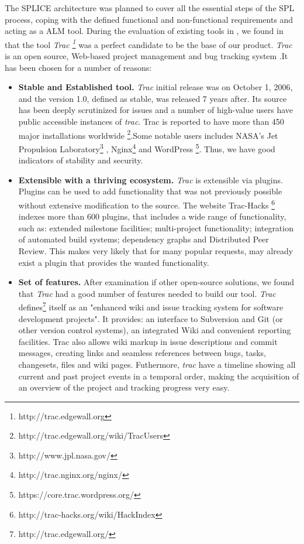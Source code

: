 The \ac{SPLICE} architecture was planned to cover all the essential steps of the \acf{SPL} process, coping with the defined functional and non-functional requirements and acting as a \acf{ALM} tool.  During the evaluation of existing tools in , we found in that the tool \textit{Trac \footnote{http://trac.edgewall.org}} was a perfect candidate to be the base of our product. \textit{Trac} is an open source, Web-based project management and bug tracking system .It has been chosen for a number of reasons:
\begin{itemize}
\item  \textbf{Stable and Established tool.} \textit{Trac} initial release was on October 1, 2006, and the version 1.0, defined as stable, was released 7 years after. Its source has been deeply scrutinized for issues and a number of high-value users have public accessible instances of \textit{trac}. Trac is reported to have more than 450 major installations worldwide \footnote{http://trac.edgewall.org/wiki/TracUsers}.Some notable users includes NASA's Jet Propulsion Laboratory\footnote{http://www.jpl.nasa.gov/}  , Nginx\footnote{http://trac.nginx.org/nginx/} and WordPress \footnote{https://core.trac.wordpress.org/}. Thus, we have good indicators of stability and security.

\item  \textbf{Extensible with a thriving ecosystem.} \textit{Trac} is extensible via plugins. Plugins can be used to add functionality that was not previously possible without extensive modification to the source. The website Trac-Hacks \footnote{http://trac-hacks.org/wiki/HackIndex} indexes more than 600 plugins, that includes a wide range of functionality, such as: extended milestone facilities; multi-project functionality; integration of automated build systems; dependency graphs and Distributed Peer Review.
This makes very likely that for many popular requests, may already exist a plugin that provides the wanted functionality.

\item  \textbf{Set of features.} 
After examination if other open-source solutions, we found that \textit{Trac} had a good number of features needed to build our tool. \textit{Trac} defines\footnote{http://trac.edgewall.org/} itself as an "enhanced wiki and issue tracking system for software development projects". It provides: an interface to Subversion and Git (or other version control systems), an integrated Wiki and convenient reporting facilities. Trac also allows wiki markup in issue descriptions and commit messages, creating links and seamless references between bugs, tasks, changesets, files and wiki pages. Futhermore, \textit{trac} have a timeline showing all current and past project events in a temporal order, making the acquisition of an overview of the project and tracking progress very easy. 


\end{itemize}

